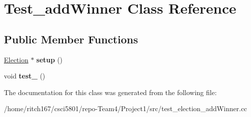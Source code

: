 \hypertarget{classTest__addWinner}{}\section{Test\+\_\+add\+Winner Class Reference}
\label{classTest__addWinner}
\subsection*{Public Member Functions}
\begin{DoxyCompactItemize}
\item 
\mbox{\label{classTest__addWinner_a8ae03c8e1d010f8e2a8919327a740442}} 
\hyperlink{classElection}{Election} $\ast$ {\bfseries setup} ()
\item 
\mbox{\label{classTest__addWinner_a35cdff5d16e43ed778d150bcb17deae9}} 
void {\bfseries test\+\_} ()
\end{DoxyCompactItemize}


The documentation for this class was generated from the following file\+:\begin{DoxyCompactItemize}
\item 
/home/ritch167/csci5801/repo-\/\+Team4/\+Project1/src/test\+\_\+election\+\_\+add\+Winner.\+cc\end{DoxyCompactItemize}
